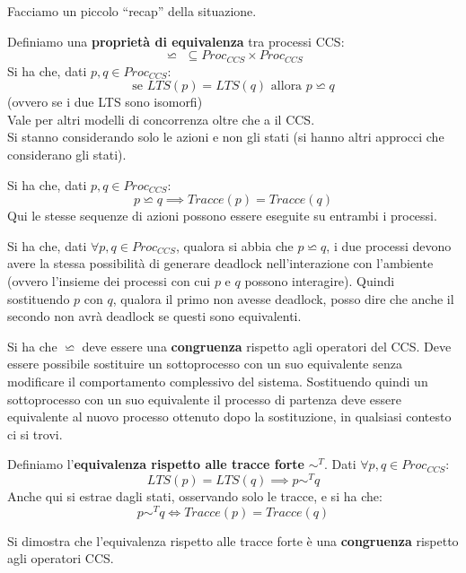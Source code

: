 \documentclass[a4paper,12pt, oneside]{book}
\begin{document}
Facciamo un piccolo ``recap'' della situazione.
\begin{definizione}
  Definiamo una \textbf{proprietà di equivalenza} tra processi CCS:
  \[\backsimeq \,\,\subseteq  Proc_{CCS}\times  Proc_{CCS}\]
  Si ha che, dati $p,q\in Proc_{CCS}$:
  \[\mbox{se }LTS(p)=LTS(q)\mbox{ allora } p\backsimeq q\]
  (ovvero se i due LTS sono isomorfi)\\
  Vale per altri modelli di concorrenza oltre che a il CCS.\\
  Si stanno considerando solo le azioni e non gli stati (si hanno altri approcci
  che considerano gli stati).
\end{definizione}
\begin{teorema}
  Si ha che, dati $p,q\in Proc_{CCS}$:
  \[p\backsimeq q\implies Tracce(p)=Tracce(q)\]
  Qui le stesse sequenze di azioni possono essere eseguite su entrambi i
  processi.  
\end{teorema}
\begin{teorema}
  Si ha che, dati $\forall p,q\in Proc_{CCS}$, qualora si abbia che $p\backsimeq
  q$, i due processi devono avere la stessa possibilità di generare deadlock
  nell'interazione con l'ambiente (ovvero l'insieme dei processi con cui $p$ e
  $q$ possono interagire). Quindi sostituendo $p$ con $q$, qualora il
  primo non avesse deadlock, posso dire che anche il secondo non avrà deadlock
  se questi sono equivalenti.
\end{teorema}
\begin{teorema}
  Si ha che $\backsimeq$ deve essere una \textbf{congruenza} rispetto agli
  operatori del CCS. Deve essere possibile sostituire un sottoprocesso con un
  suo equivalente senza modificare il comportamento complessivo del
  sistema. Sostituendo quindi un sottoprocesso con un suo equivalente il
  processo di partenza deve essere equivalente al nuovo processo ottenuto dopo
  la sostituzione, in qualsiasi contesto ci si trovi.
\end{teorema}
\begin{definizione}
  Definiamo l'\textbf{equivalenza rispetto alle tracce forte} $\sim^T$. Dati
  $\forall p,q\in Proc_{CCS}$:
  \[LTS(p)=LTS(q)\implies p\sim^T q\]
  Anche qui si estrae dagli stati, osservando solo le tracce, e si ha che:
  \[p\sim^T q\iff Tracce(p)=Tracce(q)\]
\end{definizione}
\begin{teorema}
  Si dimostra che l'equivalenza rispetto alle tracce forte è una
  \textbf{congruenza} rispetto agli operatori CCS.
\end{teorema}
\end{document}
